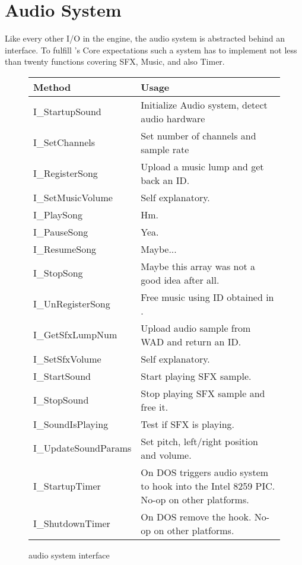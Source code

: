 \section{Audio System}
\label{dmx_section}
Like every other I/O in the engine, the audio system is abstracted behind an interface. To fulfill \doom's Core expectations such a system has to implement not less than twenty functions covering SFX, Music, and also Timer.\\
\par
 \begin{figure}[H]
\centering  
\begin{tabularx}{\textwidth}{ L{0.6}  L{1.4}}
  \toprule
  \textbf{Method} &  \textbf{Usage}\\

  \toprule 
  I\_StartupSound & Initialize Audio system, detect audio hardware\\
  I\_SetChannels & Set number of channels and sample rate\\
  \toprule 
   
I\_RegisterSong & Upload a music lump and get back an ID.\\
I\_SetMusicVolume & Self explanatory.\\
I\_PlaySong & Hm.\\
I\_PauseSong & Yea.\\
I\_ResumeSong & Maybe...\\
I\_StopSong & Maybe this array was not a good idea after all.\\
I\_UnRegisterSong & Free music using ID obtained in .\\




  \toprule 
I\_GetSfxLumpNum & Upload audio sample from WAD and return an ID.\\
I\_SetSfxVolume & Self explanatory.\\
I\_StartSound & Start playing SFX sample.\\
I\_StopSound & Stop playing SFX sample and free it.\\
I\_SoundIsPlaying & Test if SFX is playing.\\
I\_UpdateSoundParams & Set pitch, left/right position and volume.\\

  \toprule 
  
I\_StartupTimer & On DOS triggers audio system to hook into the Intel 8259 PIC. No-op on other platforms.\\
I\_ShutdownTimer & On DOS remove the hook.  No-op on other platforms.\\

   \toprule
\end{tabularx}
\caption{\doom audio system interface}
\end{figure}



